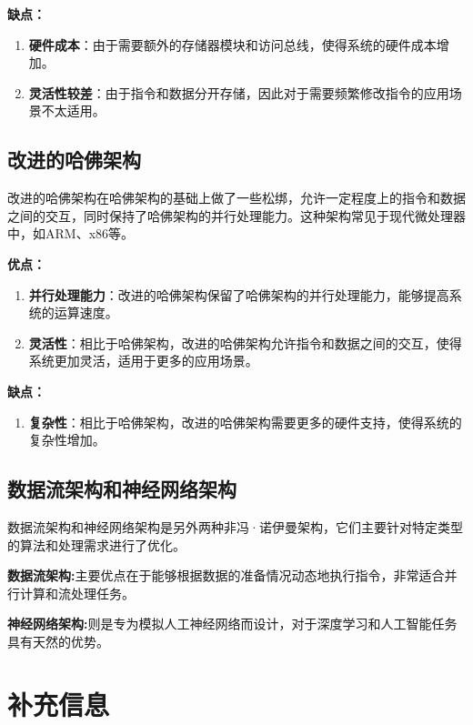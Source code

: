 \documentclass[12pt]{article} %
\theoremstyle{definition}
\begin{document}
\textbf{缺点：}
\begin{enumerate}
  \item \textbf{硬件成本}：由于需要额外的存储器模块和访问总线，使得系统的硬件成本增加。
  \item \textbf{灵活性较差}：由于指令和数据分开存储，因此对于需要频繁修改指令的应用场景不太适用。
\end{enumerate}

\subsection{改进的哈佛架构}

改进的哈佛架构在哈佛架构的基础上做了一些松绑，允许一定程度上的指令和数据之间的交互，同时保持了哈佛架构的并行处理能力。这种架构常见于现代微处理器中，如ARM、x86等\cite{HarvardArchitecture, Pawson2022MythHarvard}。

\textbf{优点：}
\begin{enumerate}
  \item \textbf{并行处理能力}：改进的哈佛架构保留了哈佛架构的并行处理能力，能够提高系统的运算速度。
  \item \textbf{灵活性}：相比于哈佛架构，改进的哈佛架构允许指令和数据之间的交互，使得系统更加灵活，适用于更多的应用场景。
\end{enumerate}

\textbf{缺点：}
\begin{enumerate}
  \item \textbf{复杂性}：相比于哈佛架构，改进的哈佛架构需要更多的硬件支持，使得系统的复杂性增加。
\end{enumerate}

\subsection{数据流架构和神经网络架构}

数据流架构和神经网络架构是另外两种非冯·诺伊曼架构，它们主要针对特定类型的算法和处理需求进行了优化\cite{Siriwardhane2020ComputerArchitecture}。

\textbf{数据流架构:}主要优点在于能够根据数据的准备情况动态地执行指令，非常适合并行计算和流处理任务。

\textbf{神经网络架构:}则是专为模拟人工神经网络而设计，对于深度学习和人工智能任务具有天然的优势。

\section{补充信息}
\end{document}
